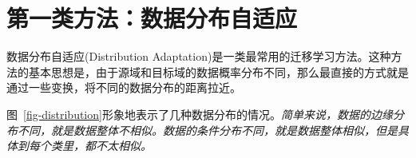 \newpage
\section{第一类方法：数据分布自适应}

数据分布自适应(Distribution Adaptation)是一类最常用的迁移学习方法。这种方法的基本思想是，由于源域和目标域的数据概率分布不同，那么最直接的方式就是通过一些变换，将不同的数据分布的距离拉近。

图~\ref{fig-distribution}形象地表示了几种数据分布的情况。\textit{简单来说，数据的边缘分布不同，就是数据整体不相似。数据的条件分布不同，就是数据整体相似，但是具体到每个类里，都不太相似。}

\begin{figure}[htbp]
	\centering
	~\vline
	~

\end{figure}
